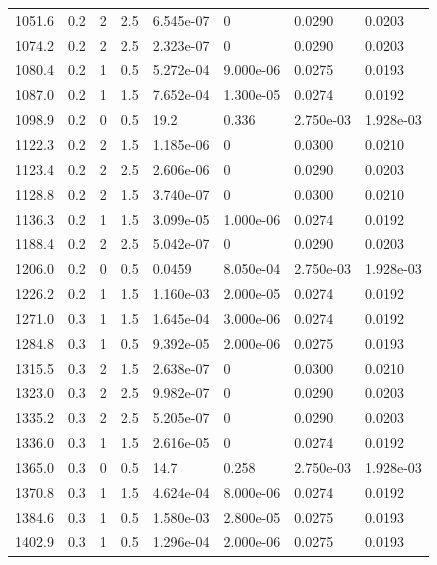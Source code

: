 \documentclass[preview]{standalone}
\begin{document}
{{{\begin{tabular}{L{1.2cm}C{1.2cm} C{0.3cm}C{0.5cm} C{1.4cm}C{1.4cm} C{1.4cm}C{1.4cm}}
  1051.6  &   0.2  & 2     & 2.5 &  6.545e-07  & 0  & 0.0290 &  0.0203   \\ 
  1074.2  &   0.2  & 2     & 2.5 &  2.323e-07  & 0  & 0.0290 &  0.0203   \\ 
  1080.4  &   0.2  & 1     & 0.5 &  5.272e-04  & 9.000e-06  & 0.0275 &  0.0193   \\ 
  1087.0  &   0.2  & 1     & 1.5 &  7.652e-04  & 1.300e-05  & 0.0274 &  0.0192   \\ 
  1098.9  &   0.2  & 0     & 0.5 &  19.2  & 0.336  & 2.750e-03 &  1.928e-03   \\ 
  1122.3  &   0.2  & 2     & 1.5 &  1.185e-06  & 0  & 0.0300 &  0.0210   \\ 
  1123.4  &   0.2  & 2     & 2.5 &  2.606e-06  & 0  & 0.0290 &  0.0203   \\ 
  1128.8  &   0.2  & 2     & 1.5 &  3.740e-07  & 0  & 0.0300 &  0.0210   \\ 
  1136.3  &   0.2  & 1     & 1.5 &  3.099e-05  & 1.000e-06  & 0.0274 &  0.0192   \\ 
  1188.4  &   0.2  & 2     & 2.5 &  5.042e-07  & 0  & 0.0290 &  0.0203   \\ 
  1206.0  &   0.2  & 0     & 0.5 &  0.0459  & 8.050e-04  & 2.750e-03 &  1.928e-03   \\ 
  1226.2  &   0.2  & 1     & 1.5 &  1.160e-03  & 2.000e-05  & 0.0274 &  0.0192   \\ 
  1271.0  &   0.3  & 1     & 1.5 &  1.645e-04  & 3.000e-06  & 0.0274 &  0.0192   \\ 
  1284.8  &   0.3  & 1     & 0.5 &  9.392e-05  & 2.000e-06  & 0.0275 &  0.0193   \\ 
  1315.5  &   0.3  & 2     & 1.5 &  2.638e-07  & 0  & 0.0300 &  0.0210   \\ 
  1323.0  &   0.3  & 2     & 2.5 &  9.982e-07  & 0  & 0.0290 &  0.0203   \\ 
  1335.2  &   0.3  & 2     & 2.5 &  5.205e-07  & 0  & 0.0290 &  0.0203   \\ 
  1336.0  &   0.3  & 1     & 1.5 &  2.616e-05  & 0  & 0.0274 &  0.0192   \\ 
  1365.0  &   0.3  & 0     & 0.5 &  14.7  & 0.258  & 2.750e-03 &  1.928e-03   \\ 
  1370.8  &   0.3  & 1     & 1.5 &  4.624e-04  & 8.000e-06  & 0.0274 &  0.0192   \\ 
  1384.6  &   0.3  & 1     & 0.5 &  1.580e-03  & 2.800e-05  & 0.0275 &  0.0193   \\ 
  1402.9  &   0.3  & 1     & 0.5 &  1.296e-04  & 2.000e-06  & 0.0275 &  0.0193   \\ 

\end{tabular}}}}
\end{document}
